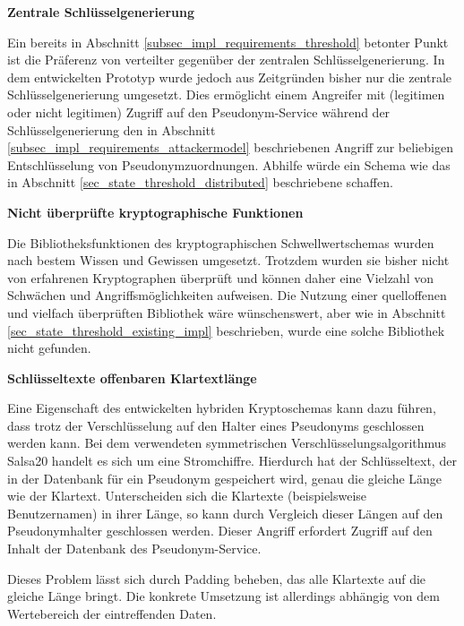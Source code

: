 
\textbf{Zentrale Schlüsselgenerierung}

Ein bereits in Abschnitt \ref{subsec_impl_requirements_threshold} betonter Punkt ist die Präferenz von verteilter gegenüber der zentralen Schlüsselgenerierung. In dem entwickelten Prototyp wurde jedoch aus Zeitgründen bisher nur die zentrale Schlüsselgenerierung umgesetzt. Dies ermöglicht einem Angreifer mit (legitimen oder nicht legitimen) Zugriff auf den Pseudonym-Service während der Schlüsselgenerierung den in Abschnitt \ref{subsec_impl_requirements_attackermodel} beschriebenen Angriff zur beliebigen Entschlüsselung von Pseudonymzuordnungen. Abhilfe würde ein Schema wie das in Abschnitt \ref{sec_state_threshold_distributed} beschriebene schaffen.


\textbf{Nicht überprüfte kryptographische Funktionen}

Die Bibliotheksfunktionen des kryptographischen Schwellwertschemas wurden nach bestem Wissen und Gewissen umgesetzt. Trotzdem wurden sie bisher nicht von erfahrenen Kryptographen überprüft und können daher eine Vielzahl von Schwächen und Angriffsmöglichkeiten aufweisen. Die Nutzung einer quelloffenen und vielfach überprüften Bibliothek wäre wünschenswert, aber wie in Abschnitt \ref{sec_state_threshold_existing_impl} beschrieben, wurde eine solche Bibliothek nicht gefunden.


\textbf{Schlüsseltexte offenbaren Klartextlänge}

Eine Eigenschaft des entwickelten hybriden Kryptoschemas kann dazu führen, dass trotz der Verschlüsselung auf den Halter eines Pseudonyms geschlossen werden kann. Bei dem verwendeten symmetrischen Verschlüsselungsalgorithmus Salsa20 handelt es sich um eine Stromchiffre. Hierdurch hat der Schlüsseltext, der in der Datenbank für ein Pseudonym gespeichert wird, genau die gleiche Länge wie der Klartext. Unterscheiden sich die Klartexte (beispielsweise Benutzernamen) in ihrer Länge, so kann durch Vergleich dieser Längen auf den Pseudonymhalter geschlossen werden.  Dieser Angriff erfordert Zugriff auf den Inhalt der Datenbank des Pseudonym-Service.

Dieses Problem lässt sich durch Padding beheben, das alle Klartexte auf die gleiche Länge bringt. Die konkrete Umsetzung ist allerdings abhängig von dem Wertebereich der eintreffenden Daten.

